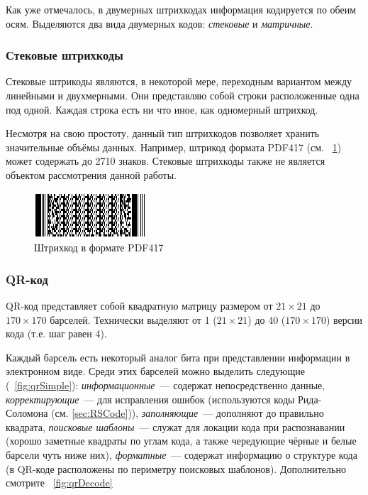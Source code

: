 Как уже отмечалось, в двумерных штрихкодах информация кодируется
по обеим осям. Выделяются два вида двумерных кодов: \textit{стековые}
и \textit{матричные}.

\subsubsection{Стековые штрихкоды}  
Стековые штрикоды являются, в некоторой мере, переходным вариантом
между линейными и двухмерными. Они представляю собой строки расположенные
одна под одной. Каждая строка есть ни что иное, как одномерный штрихкод.

Несмотря на свою простоту, данный тип штрихкодов позволяет хранить 
значительные объёмы данных. Например, штрикод формата PDF417 
(см. \figurename\ \ref{fig:pdf417}) может содержать до 2710 знаков.
Стековые штрихкоды также не является объектом рассмотрения данной
работы. 

\begin{figure}[htb]
    \centering
    \includegraphics{img/pdf417_sample}
    \caption{Штрихкод в формате PDF417}
    \label{fig:pdf417}
\end{figure}

\subsubsection{QR-код}

QR-код представляет собой квадратную матрицу размером от $21 \times 21$ до 
$170 \times 170$ барселей. Технически выделяют от 1 ($21 \times 21$) до
40 ($170 \times 170$) версии кода (т.е. шаг равен 4).

Каждый барсель есть некоторый 
аналог бита при представлении информации в электронном виде. Среди этих
барселей можно выделить следующие (\figurename\ \ref{fig:qrSimple}): 
\textit{информационные}~--- содержат 
непосредственно данные, \textit{корректирующие}~--- для исправления ошибок
(используются коды Рида-Соломона (см. \ref{sec:RSCode})), 
\textit{заполняющие}~---
дополняют до правильно квадрата, \textit{поисковые шаблоны}~--- 
служат для локации кода при распознавании (хорошо заметные квадраты по 
углам кода, а также чередующие чёрные и белые барсели чуть ниже них), 
\textit{форматные}~--- содержат информацию о структуре кода (в QR-коде 
расположены по периметру поисковых шаблонов). Дополнительно смотрите 
\figurename\ \ref{fig:qrDecode}

